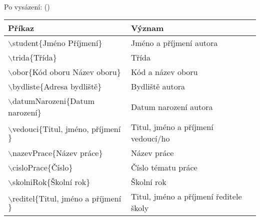 \documentclass[a4paper, 12pt]{report}
\begin{document}
	\\[1cm]
	Po vysázení: ()
	
	\begin{table}[h]
		\centering
		\begin{tabular}{ll}	
			\toprule[1.5pt]
			Příkaz & Význam\\
			\midrule
			$\backslash$student$\{$Jméno Příjmení$\}$ & Jméno a příjmení autora\\
			$\backslash$trida$\{$Třída$\}$ & Třída\\
			$\backslash$obor$\{$Kód oboru Název oboru$\}$ & Kód a název oboru\\
			$\backslash$bydliste$\{$Adresa bydliště$\}$ & Bydliště autora\\
			$\backslash$datumNarozeni$\{$Datum narození$\}$ & Datum narození autora\\
			$\backslash$vedouci$\{$Titul, jméno, příjmení$\}$ & Titul, jméno a příjmení vedoucí/ho\\
			$\backslash$nazevPrace$\{$Název práce$\}$ & Název práce\\
			$\backslash$cisloPrace$\{$Číslo$\}$ & Číslo tématu práce\\
			$\backslash$skolniRok$\{$Školní rok$\}$ & Školní rok\\
			$\backslash$reditel$\{$Titul, jméno a příjmení$\}$ & Titul, jméno a příjmení ředitele školy\\
			\bottomrule[1,5pt]
		\end{tabular}
	\end{table}
	
\end{document}
